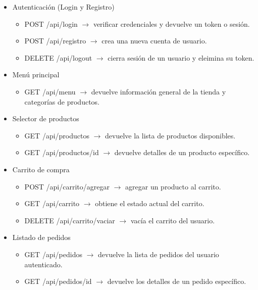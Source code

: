 \documentclass[10pt]{book}
\begin{document}
        \begin{itemize}
            \item Autenticación (Login y Registro)
            \begin{itemize}
                \item POST /api/login $\rightarrow$ verificar credenciales y devuelve un token o sesión.
                \item POST /api/registro $\rightarrow$ crea una nueva cuenta de usuario.
                \item DELETE /api/logout $\rightarrow$ cierra sesión de un usuario y eleimina su token.
            \end{itemize}
            \item Menú principal
            \begin{itemize}
                \item GET /api/menu $\rightarrow$ devuelve información general de la tienda y categorías de productos.
            \end{itemize}
            \item Selector de productos
            \begin{itemize}
                \item GET /api/productos $\rightarrow$ devuelve la lista de productos disponibles.
                \item GET /api/productos/{id} $\rightarrow$ devuelve detalles de un producto específico.
            \end{itemize}
            \item Carrito de compra
            \begin{itemize}
                \item POST /api/carrito/agregar $\rightarrow$ agregar un producto al carrito.
                \item GET /api/carrito $\rightarrow$ obtiene el estado actual del carrito.
                \item DELETE /api/carrito/vaciar $\rightarrow$ vacía el carrito del usuario.
            \end{itemize}
            \item Listado de pedidos
            \begin{itemize}
                \item GET /api/pedidos $\rightarrow$ devuelve la lista de pedidos del usuario autenticado.
                \item GET /api/pedidos/{id} $\rightarrow$ devuelve los detalles de un pedido específico.

\end{itemize}
\end{itemize}
\end{document}
